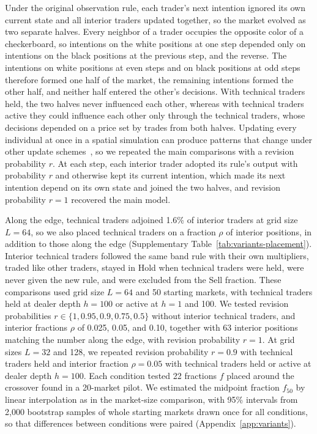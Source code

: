 Under the original observation rule, each trader's next intention
ignored its own current state and all interior traders updated together,
so the market evolved as two separate halves. Every neighbor of a trader
occupies the opposite color
of a checkerboard, so intentions on the white positions at one step
depended only on intentions on the black positions at the previous step,
and the reverse. The intentions on white positions at even steps and on
black positions at odd steps therefore formed one half of the market,
the remaining intentions formed the other half, and neither half entered
the other's decisions. With technical traders held, the two halves never
influenced each other, whereas with technical traders active they could
influence each other only through the technical traders, whose decisions
depended on a price set by trades from both halves. Updating every
individual at once in a spatial simulation can produce patterns that
change under other update schemes~\cite{huberman1993evolutionary}, so we
repeated the main
comparisons with a revision probability $r$. At each step, each interior
trader adopted its rule's output with probability $r$ and otherwise kept
its current intention, which made its next intention depend on its own
state and joined the two halves, and revision probability $r=1$ recovered
the main model.

Along the edge, technical traders adjoined 1.6\% of interior traders at
grid size $L=64$, so we also placed technical traders on a fraction
$\rho$ of interior positions, in addition to those along the edge
(Supplementary Table~\ref{tab:variants-placement}). Interior technical
traders followed the same band rule with their own multipliers, traded
like other traders, stayed in Hold when technical traders were held,
were never given the new rule, and were excluded from the Sell fraction.
These comparisons used grid size $L=64$ and 50 starting markets, with
technical traders held at dealer depth $h=100$ or active at $h=1$ and
100. We tested revision probabilities $r\in\{1,0.95,0.9,0.75,0.5\}$
without interior technical traders, and interior fractions $\rho$ of
0.025, 0.05, and 0.10, together with 63 interior positions matching the
number along the edge, with revision probability $r=1$. At grid sizes
$L=32$ and 128, we repeated revision probability $r=0.9$ with technical
traders held and interior fraction $\rho=0.05$ with technical traders
held or active at dealer depth $h=100$. Each condition tested 22
fractions $f$ placed around the crossover found in a 20-market pilot. We
estimated the midpoint fraction $f_{50}$ by linear interpolation as in the market-size
comparison, with 95\% intervals from 2,000 bootstrap samples of whole
starting markets drawn once for all conditions, so that differences
between conditions were paired (Appendix~\ref{app:variants}).


